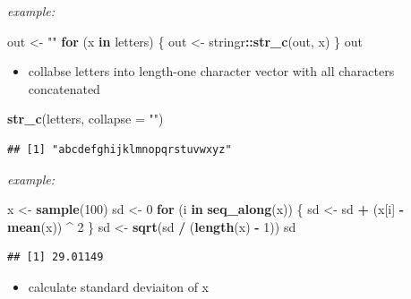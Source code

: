 \documentclass[]{book}
\newenvironment{Shaded}{\begin{snugshade}}{\end{snugshade}}
\newcommand{\ControlFlowTok}[1]{\textcolor[rgb]{0.13,0.29,0.53}{\textbf{#1}}}
\newcommand{\DataTypeTok}[1]{\textcolor[rgb]{0.13,0.29,0.53}{#1}}
\newcommand{\DecValTok}[1]{\textcolor[rgb]{0.00,0.00,0.81}{#1}}
\newcommand{\KeywordTok}[1]{\textcolor[rgb]{0.13,0.29,0.53}{\textbf{#1}}}
\newcommand{\NormalTok}[1]{#1}
\newcommand{\OperatorTok}[1]{\textcolor[rgb]{0.81,0.36,0.00}{\textbf{#1}}}
\newcommand{\StringTok}[1]{\textcolor[rgb]{0.31,0.60,0.02}{#1}}
\providecommand{\tightlist}{%
  \setlength{\itemsep}{0pt}\setlength{\parskip}{0pt}}
\theoremstyle{definition}
\theoremstyle{definition}
\theoremstyle{definition}
\theoremstyle{remark}
\begin{document}
\begin{enumerate}
  \emph{example:}

\begin{Shaded}
\begin{Highlighting}[]
\NormalTok{out <-}\StringTok{ ""}
\ControlFlowTok{for}\NormalTok{ (x }\ControlFlowTok{in}\NormalTok{ letters) \{}
\NormalTok{  out <-}\StringTok{ }\NormalTok{stringr}\OperatorTok{::}\KeywordTok{str_c}\NormalTok{(out, x)}
\NormalTok{\}}
\NormalTok{out}
\end{Highlighting}
\end{Shaded}

  \begin{itemize}
  \tightlist
  \item
    collabse letters into length-one character vector with all
    characters concatenated
  \end{itemize}

\begin{Shaded}
\begin{Highlighting}[]
\KeywordTok{str_c}\NormalTok{(letters, }\DataTypeTok{collapse =} \StringTok{""}\NormalTok{)}
\end{Highlighting}
\end{Shaded}

\begin{verbatim}
## [1] "abcdefghijklmnopqrstuvwxyz"
\end{verbatim}

  \emph{example:}

\begin{Shaded}
\begin{Highlighting}[]
\NormalTok{x <-}\StringTok{ }\KeywordTok{sample}\NormalTok{(}\DecValTok{100}\NormalTok{)}
\NormalTok{sd <-}\StringTok{ }\DecValTok{0}
\ControlFlowTok{for}\NormalTok{ (i }\ControlFlowTok{in} \KeywordTok{seq_along}\NormalTok{(x)) \{}
\NormalTok{  sd <-}\StringTok{ }\NormalTok{sd }\OperatorTok{+}\StringTok{ }\NormalTok{(x[i] }\OperatorTok{-}\StringTok{ }\KeywordTok{mean}\NormalTok{(x)) }\OperatorTok{^}\StringTok{ }\DecValTok{2}
\NormalTok{\}}
\NormalTok{sd <-}\StringTok{ }\KeywordTok{sqrt}\NormalTok{(sd }\OperatorTok{/}\StringTok{ }\NormalTok{(}\KeywordTok{length}\NormalTok{(x) }\OperatorTok{-}\StringTok{ }\DecValTok{1}\NormalTok{))}
\NormalTok{sd}
\end{Highlighting}
\end{Shaded}

\begin{verbatim}
## [1] 29.01149
\end{verbatim}

  \begin{itemize}
  \tightlist
  \item
    calculate standard deviaiton of x
  \end{itemize}


\end{enumerate}
\end{document}
